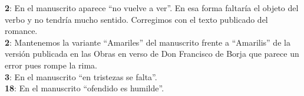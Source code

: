 \noindent \textbf{2}: En el manuscrito aparece ``no vuelve a ver''. En esa forma faltaría el objeto del verbo y no tendría mucho sentido. Corregimos con el texto publicado del romance.\\
\textbf{2}: Mantenemos la variante ``Amariles'' del manuscrito frente a ``Amarilis'' de la versión publicada en las Obras en verso de Don Francisco de Borja que parece un error pues rompe la rima.\\
\textbf{3}: En el manuscrito ``en tristezas se falta''.\\
\textbf{18}: En el manuscrito ``ofendido es humilde''.
